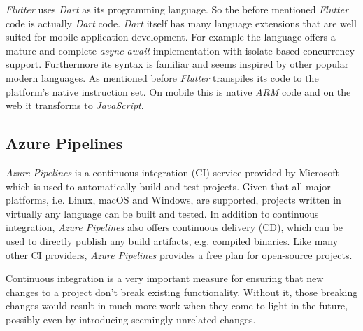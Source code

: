 \textit{Flutter} uses \textit{Dart} as its programming language. So the before mentioned \textit{Flutter}
code is actually \textit{Dart} code. \textit{Dart} itself has many language extensions that are well
suited for mobile application development. For example the language offers a mature and complete
\textit{async-await} implementation with isolate-based concurrency support. Furthermore its syntax
is familiar and seems inspired by other popular modern languages. As mentioned before
\textit{Flutter} transpiles its code to the platform's native instruction set. On mobile this is
native \textit{ARM} code and on the web it transforms to \textit{JavaScript}. \cite{dart}

\subsection{Azure Pipelines}

\textit{Azure Pipelines} is a continuous integration (CI) service provided by Microsoft which is
used to automatically build and test projects. Given that all major platforms, i.e. Linux, macOS and
Windows, are supported, projects written in virtually any language can be built and tested. In
addition to continuous integration, \textit{Azure Pipelines} also offers continuous delivery (CD),
which can be used to directly publish any build artifacts, e.g. compiled binaries. Like many other
CI providers, \textit{Azure Pipelines} provides a free plan for open-source projects.
\cite{azure-pipelines}

Continuous integration is a very important measure for ensuring that new changes to a project don't
break existing functionality. Without it, those breaking changes would result in much more work when
they come to light in the future, possibly even by introducing seemingly unrelated changes.

